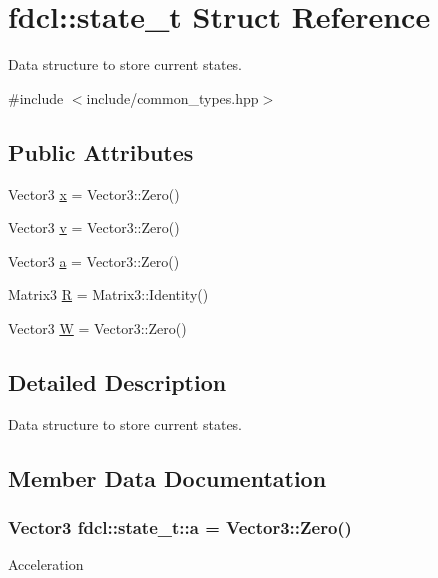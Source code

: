 \hypertarget{structfdcl_1_1state__t}{}\section{fdcl\+:\+:state\+\_\+t Struct Reference}
\label{structfdcl_1_1state__t}


Data structure to store current states.  




{\ttfamily \#include $<$include/common\+\_\+types.\+hpp$>$}

\subsection*{Public Attributes}
\begin{DoxyCompactItemize}
\item 
Vector3 \hyperlink{structfdcl_1_1state__t_a302cd41568974e5dac4a5daf005ab57b}{x} = Vector3\+::\+Zero()
\item 
Vector3 \hyperlink{structfdcl_1_1state__t_a98e6ea57e2ac698c1d86b5101c1c67cc}{v} = Vector3\+::\+Zero()
\item 
Vector3 \hyperlink{structfdcl_1_1state__t_ac9eaf94b08220eee9ca0eb2aee6dc8bd}{a} = Vector3\+::\+Zero()
\item 
Matrix3 \hyperlink{structfdcl_1_1state__t_ae23467816c212658b7bd780c6a43a364}{R} = Matrix3\+::\+Identity()
\item 
Vector3 \hyperlink{structfdcl_1_1state__t_a6de6651203fbcc51c85d0b297b405284}{W} = Vector3\+::\+Zero()
\end{DoxyCompactItemize}


\subsection{Detailed Description}
Data structure to store current states. 

\subsection{Member Data Documentation}
\subsubsection[{\texorpdfstring{a}{a}}]{\setlength{\rightskip}{0pt plus 5cm}Vector3 fdcl\+::state\+\_\+t\+::a = Vector3\+::\+Zero()}\hypertarget{structfdcl_1_1state__t_ac9eaf94b08220eee9ca0eb2aee6dc8bd}{}\label{structfdcl_1_1state__t_ac9eaf94b08220eee9ca0eb2aee6dc8bd}
Acceleration 
